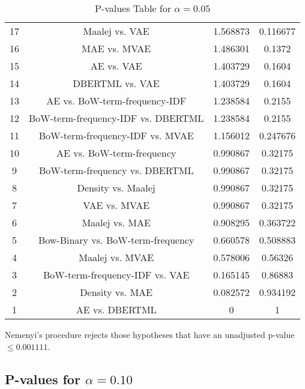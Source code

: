 \documentclass[a4paper,10pt]{article}
\begin{document}
\begin{landscape}
\begin{table}[!htp]
\begin{tabular}{cccc}
17&Maalej vs. VAE&1.568873&0.116677\\
16&MAE vs. MVAE&1.486301&0.1372\\
15&AE vs. VAE&1.403729&0.1604\\
14&DBERTML vs. VAE&1.403729&0.1604\\
13&AE vs. BoW-term-frequency-IDF&1.238584&0.2155\\
12&BoW-term-frequency-IDF vs. DBERTML&1.238584&0.2155\\
11&BoW-term-frequency-IDF vs. MVAE&1.156012&0.247676\\
10&AE vs. BoW-term-frequency&0.990867&0.32175\\
9&BoW-term-frequency vs. DBERTML&0.990867&0.32175\\
8&Density vs. Maalej&0.990867&0.32175\\
7&VAE vs. MVAE&0.990867&0.32175\\
6&Maalej vs. MAE&0.908295&0.363722\\
5&Bow-Binary vs. BoW-term-frequency&0.660578&0.508883\\
4&Maalej vs. MVAE&0.578006&0.56326\\
3&BoW-term-frequency-IDF vs. VAE&0.165145&0.86883\\
2&Density vs. MAE&0.082572&0.934192\\
1&AE vs. DBERTML&0&1\\
\hline
\end{tabular}
\caption{P-values Table for $\alpha=0.05$}
\end{table}Nemenyi's procedure rejects those hypotheses that have an unadjusted p-value $\le0.001111$.

\pagebreak

\subsection{P-values for $\alpha=0.10$}


\end{landscape}
\end{document}
